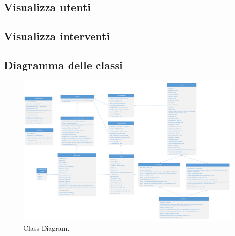 \subsection{Visualizza utenti}
\subsection{Visualizza interventi}

\begin{landscape}
	\section{Diagramma delle classi}
	\begin{figure}[h!]
		\centering
		\includegraphics[width=0.7\linewidth]{./OtherFiles/Class Diagram}
		\caption{Class Diagram.}
		\label{fig:class_diagram}
	\end{figure}
\end{landscape}